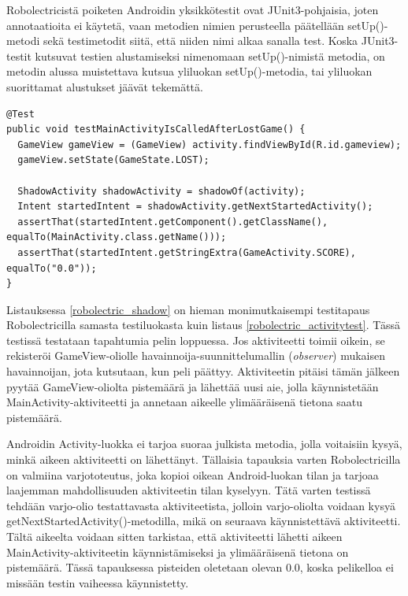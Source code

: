 Robolectricistä poiketen Androidin yksikkötestit ovat JUnit3-pohjaisia, joten annotaatioita ei käytetä, vaan metodien nimien perusteella päätellään setUp()-metodi sekä testimetodit siitä, että niiden nimi alkaa sanalla test. Koska JUnit3-testit kutsuvat testien alustamiseksi nimenomaan setUp()-nimistä metodia, on metodin alussa muistettava kutsua yliluokan setUp()-metodia, tai yliluokan suorittamat alustukset jäävät tekemättä.

\begin{lstlisting}[float,label=robolectric_shadow,caption=Aikeen tilatietojen tarkastelu Robolectricin varjo-olioilla]
@Test
public void testMainActivityIsCalledAfterLostGame() {
  GameView gameView = (GameView) activity.findViewById(R.id.gameview);
  gameView.setState(GameState.LOST);
  	
  ShadowActivity shadowActivity = shadowOf(activity);
  Intent startedIntent = shadowActivity.getNextStartedActivity();
  assertThat(startedIntent.getComponent().getClassName(), equalTo(MainActivity.class.getName()));
  assertThat(startedIntent.getStringExtra(GameActivity.SCORE), equalTo("0.0"));
}
\end{lstlisting}

Listauksessa \ref{robolectric_shadow} on hieman monimutkaisempi testitapaus Robolectricilla samasta testiluokasta kuin listaus \ref{robolectric_activitytest}. Tässä testissä testataan tapahtumia pelin loppuessa. Jos aktiviteetti toimii oikein, se rekisteröi GameView-oliolle havainnoija-suunnittelumallin (\emph{observer}) mukaisen havainnoijan, jota kutsutaan, kun peli päättyy. Aktiviteetin pitäisi tämän jälkeen pyytää GameView-oliolta pistemäärä ja lähettää uusi aie, jolla käynnistetään MainActivity-aktiviteetti ja annetaan aikeelle ylimääräisenä tietona saatu pistemäärä.

Androidin Activity-luokka ei tarjoa suoraa julkista metodia, jolla voitaisiin kysyä, minkä aikeen aktiviteetti on lähettänyt. Tällaisia tapauksia varten Robolectricilla on valmiina varjototeutus, joka kopioi oikean Android-luokan tilan ja tarjoaa laajemman mahdollisuuden aktiviteetin tilan kyselyyn. Tätä varten testissä tehdään varjo-olio testattavasta aktiviteetista, jolloin varjo-oliolta voidaan kysyä getNextStartedActivity()-metodilla, mikä on seuraava käynnistettävä aktiviteetti. Tältä aikeelta voidaan sitten tarkistaa, että aktiviteetti lähetti aikeen MainActivity-aktiviteetin käynnistämiseksi ja ylimääräisenä tietona on pistemäärä. Tässä tapauksessa pisteiden oletetaan olevan 0.0, koska pelikelloa ei missään testin vaiheessa käynnistetty.


